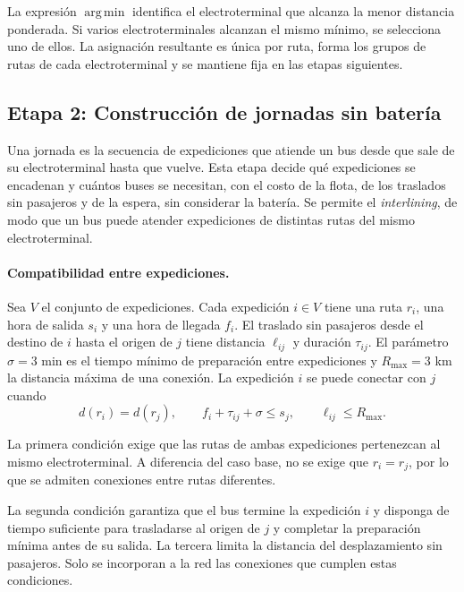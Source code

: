 La expresión $\operatorname*{arg\,min}$ identifica el electroterminal
que alcanza la menor distancia ponderada. Si varios electroterminales alcanzan el mismo mínimo, se selecciona uno de ellos. La asignación resultante es única por ruta, forma los grupos de rutas de cada electroterminal y se mantiene fija en las etapas siguientes.

\subsection{Etapa 2: Construcción de jornadas sin batería}
\label{sec:etapa2}

Una jornada es la secuencia de expediciones que atiende un bus desde que sale de su electroterminal hasta que vuelve. Esta etapa decide qué expediciones se encadenan y cuántos buses se necesitan, con el costo de la flota, de los traslados sin pasajeros y de la espera, sin considerar la batería. Se permite el \textit{interlining}, de modo que un bus puede atender expediciones de distintas rutas del mismo electroterminal.

\paragraph{Compatibilidad entre expediciones.}
Sea $V$ el conjunto de expediciones. Cada expedición $i \in V$ tiene una ruta $r_i$, una hora de salida $s_i$ y una hora de llegada $f_i$. El traslado sin pasajeros desde el destino de $i$ hasta el origen de $j$ tiene distancia $\ell_{ij}$ y duración $\tau_{ij}$. El parámetro $\sigma = 3$ min es el tiempo mínimo de preparación entre expediciones y $R_{\max} = 3$ km la distancia máxima de una conexión. La expedición $i$ se puede conectar con $j$ cuando
\begin{equation}
    d(r_i) = d(r_j), \qquad
    f_i + \tau_{ij} + \sigma \leq s_j, \qquad
    \ell_{ij} \leq R_{\max}.
    \label{eq:compatibilidad}
\end{equation}

La primera condición exige que las rutas de ambas expediciones
pertenezcan al mismo electroterminal. A diferencia del caso base,
no se exige que $r_i = r_j$, por lo que se admiten conexiones entre
rutas diferentes.

La segunda condición garantiza que el bus termine la expedición $i$
y disponga de tiempo suficiente para trasladarse al origen de $j$
y completar la preparación mínima antes de su salida. La tercera
limita la distancia del desplazamiento sin pasajeros. Solo se incorporan
a la red las conexiones que cumplen estas condiciones.

